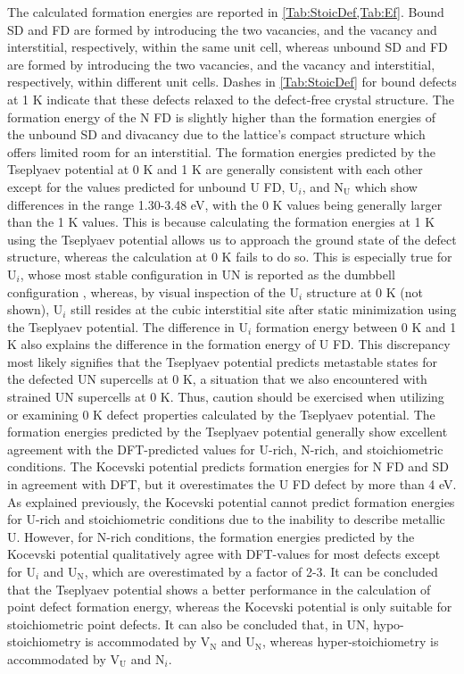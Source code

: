 \documentclass[preprint, 12pt]{elsarticle}
\begin{document}
The calculated formation energies are reported in \cref{Tab:StoicDef,Tab:Ef}. Bound SD and FD are formed by introducing the two vacancies, and the vacancy and interstitial, respectively, within the same unit cell, whereas unbound SD and FD are formed by introducing the two vacancies, and the vacancy and interstitial, respectively, within different unit cells. Dashes in \cref{Tab:StoicDef} for bound defects at 1 K indicate that these defects relaxed to the defect-free crystal structure. The formation energy of the N FD is slightly higher than the formation energies of the unbound SD and divacancy due to the lattice's compact structure which offers limited room for an interstitial. The formation energies predicted by the Tseplyaev potential at 0 K and 1 K are generally consistent with each other except for the values predicted for unbound U FD, U$_i$, and N$_\text{U}$ which show differences in the range 1.30-3.48 eV, with the 0 K values being generally larger than the 1 K values. This is because calculating the formation energies at 1 K using the Tseplyaev potential allows us to approach the ground state of the defect structure, whereas the calculation at 0 K fails to do so. This is especially true for U$_i$, whose most stable configuration in UN is reported as the dumbbell configuration \cite{Kuksin2016}, whereas, by visual inspection of the U$_i$ structure at 0 K (not shown), U$_i$ still resides at the cubic interstitial site after static minimization using the Tseplyaev potential. The difference in U$_i$ formation energy between 0 K and 1 K also explains the difference in the formation energy of U FD. This discrepancy most likely signifies that the Tseplyaev potential predicts metastable states for the defected UN supercells at 0 K, a situation that we also encountered with strained UN supercells at 0 K. Thus, caution should be exercised when utilizing or examining 0 K defect properties calculated by the Tseplyaev potential. The formation energies predicted by the Tseplyaev potential generally show excellent agreement with the DFT-predicted values for U-rich, N-rich, and stoichiometric conditions. The Kocevski potential predicts formation energies for N FD and SD in agreement with DFT, but it overestimates the U FD defect by more than 4 eV. As explained previously, the Kocevski potential cannot predict formation energies for U-rich and stoichiometric conditions due to the inability to describe metallic U. However, for N-rich conditions, the formation energies predicted by the Kocevski potential qualitatively agree with DFT-values for most defects except for U$_i$ and U$_\text{N}$, which are overestimated by a factor of 2-3. It can be concluded that the Tseplyaev potential shows a better performance in the calculation of point defect formation energy, whereas the Kocevski potential is only suitable for stoichiometric point defects. It can also be concluded that, in UN, hypo-stoichiometry is accommodated by V$_\text{N}$ and U$_\text{N}$, whereas hyper-stoichiometry is accommodated by V$_\text{U}$ and N$_i$.
\end{document}
